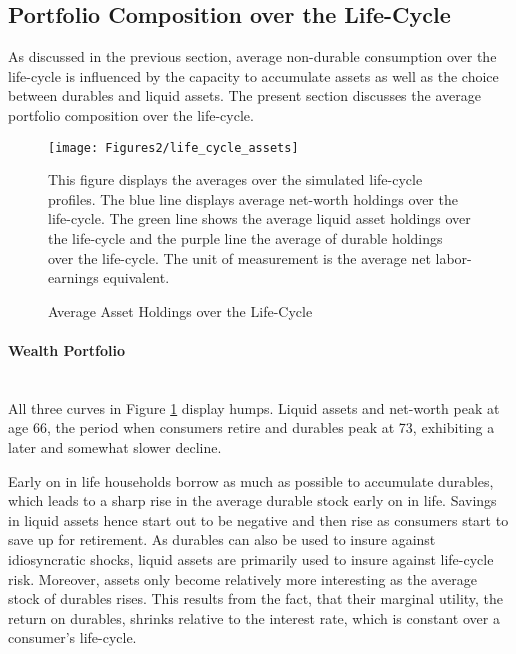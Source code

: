 \documentclass[a4paper,12pt,legno]{article}
\newcommand{\myparagraph}[1]{\paragraph{#1}\mbox{}\\}
\begin{document}
\subsection{Portfolio Composition over the Life-Cycle}
As discussed in the previous section, average non-durable consumption over the life-cycle is influenced by the capacity to accumulate assets as well as the choice between durables and liquid assets. The present section discusses the average portfolio composition over the life-cycle. 

\begin{figure}[!htbp]
\caption{Average Asset Holdings over the Life-Cycle} 
\label{asset_holdings_life_cycle}	%
\centering
\texttt{[image: Figures2/life\_cycle\_assets]}  %

\begin{minipage}{0.8\linewidth}
\footnotesize{This figure displays the averages over the simulated life-cycle profiles. The blue line displays average net-worth holdings over the life-cycle. The green line shows the average liquid asset holdings over the life-cycle and the purple line the average of durable holdings over the life-cycle. The unit of measurement is the average net labor-earnings equivalent.}
\end{minipage}

\end{figure}

\myparagraph{Wealth Portfolio} All three curves in Figure \ref{asset_holdings_life_cycle} display humps. Liquid assets and net-worth peak at age 66, the period when consumers retire and durables peak at 73, exhibiting a later and somewhat slower decline. 

Early on in life households borrow as much as possible to accumulate durables, which leads to a sharp rise in the average durable stock early on in life. Savings in liquid assets hence start out to be negative and then rise as consumers start to save up for retirement. As durables can also be used to insure against idiosyncratic shocks, liquid assets are primarily used to insure against life-cycle risk. Moreover, assets only become relatively more interesting as
the average stock of durables rises. This results from the fact, that their marginal utility, the return on durables, shrinks relative to the interest rate, which is constant over a consumer's life-cycle.
\end{document}
